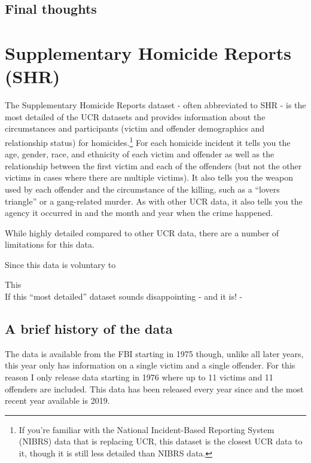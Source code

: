 \documentclass[
  12pt,
  openany]{book}
\begin{document}
\hypertarget{final-thoughts-2}{%
\section{Final thoughts}\label{final-thoughts-2}}

\hypertarget{shr}{%
\chapter{Supplementary Homicide Reports (SHR)}\label{shr}}

The Supplementary Homicide Reports dataset - often abbreviated to SHR - is the most detailed of the UCR datasets and provides information about the circumstances and participants (victim and offender demographics and relationship status) for homicides.\footnote{If you're familiar with the National Incident-Based Reporting System (NIBRS) data that is replacing UCR, this dataset is the closest UCR data to it, though it is still less detailed than NIBRS data.} For each homicide incident it tells you the age, gender, race, and ethnicity of each victim and offender as well as the relationship between the first victim and each of the offenders (but not the other victims in cases where there are multiple victims). It also tells you the weapon used by each offender and the circumstance of the killing, such as a ``lovers triangle'' or a gang-related murder. As with other UCR data, it also tells you the agency it occurred in and the month and year when the crime happened.

While highly detailed compared to other UCR data, there are a number of limitations for this data.

Since this data is voluntary to

This\\
If this ``most detailed'' dataset sounds disappointing - and it is! -

\hypertarget{a-brief-history-of-the-data-3}{%
\section{A brief history of the data}\label{a-brief-history-of-the-data-3}}

The data is available from the FBI starting in 1975 though, unlike all later years, this year only has information on a single victim and a single offender. For this reason I only release data starting in 1976 where up to 11 victims and 11 offenders are included. This data has been released every year since and the most recent year available is 2019.
\end{document}
